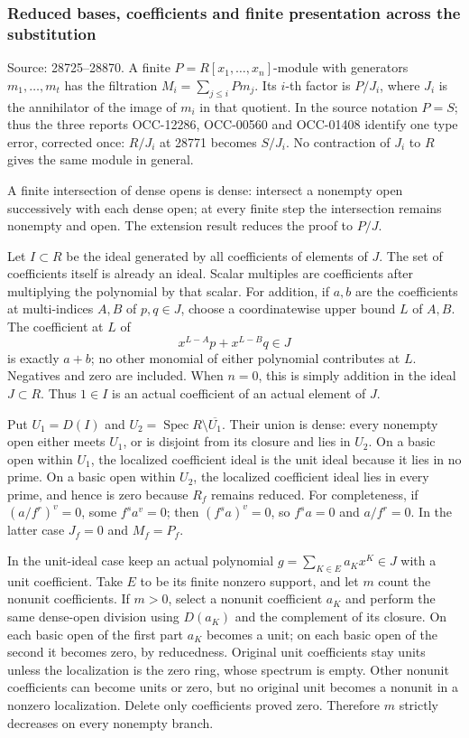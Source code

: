 \subsubsection{Reduced bases, coefficients and finite presentation across the substitution}\label{reduced-bases-coefficients-and-finite-presentation-across-the-substitution}

Source: 28725--28870. A finite \(P=R[x_1,\ldots,x_n]\)-module with generators \(m_1,\ldots,m_t\) has the filtration \(M_i=\sum_{j\le i}Pm_j\). Its \(i\)-th factor is \(P/J_i\), where \(J_i\) is the annihilator of the image of \(m_i\) in that quotient. In the source notation \(P=S\); thus the three reports OCC-12286, OCC-00560 and OCC-01408 identify one type error, corrected once: \(R/J_i\) at 28771 becomes \(S/J_i\). No contraction of \(J_i\) to \(R\) gives the same module in general.

A finite intersection of dense opens is dense: intersect a nonempty open successively with each dense open; at every finite step the intersection remains nonempty and open. The extension result reduces the proof to \(P/J\).

Let \(I\subset R\) be the ideal generated by all coefficients of elements of \(J\). The set of coefficients itself is already an ideal. Scalar multiples are coefficients after multiplying the polynomial by that scalar. For addition, if \(a,b\) are the coefficients at multi-indices \(A,B\) of \(p,q\in J\), choose a coordinatewise upper bound \(L\) of \(A,B\). The coefficient at \(L\) of \[
 x^{L-A}p+x^{L-B}q\in J
\] is exactly \(a+b\); no other monomial of either polynomial contributes at \(L\). Negatives and zero are included. When \(n=0\), this is simply addition in the ideal \(J\subset R\). Thus \(1\in I\) is an actual coefficient of an actual element of \(J\).

Put \(U_1=D(I)\) and \(U_2=\operatorname{Spec}R\setminus\overline{U_1}\). Their union is dense: every nonempty open either meets \(U_1\), or is disjoint from its closure and lies in \(U_2\). On a basic open within \(U_1\), the localized coefficient ideal is the unit ideal because it lies in no prime. On a basic open within \(U_2\), the localized coefficient ideal lies in every prime, and hence is zero because \(R_f\) remains reduced. For completeness, if \((a/f^r)^v=0\), some \(f^s a^v=0\); then \((f^s a)^v=0\), so \(f^s a=0\) and \(a/f^r=0\). In the latter case \(J_f=0\) and \(M_f=P_f\).

In the unit-ideal case keep an actual polynomial \(g=\sum_{K\in E}a_Kx^K\in J\) with a unit coefficient. Take \(E\) to be its finite nonzero support, and let \(m\) count the nonunit coefficients. If \(m>0\), select a nonunit coefficient \(a_K\) and perform the same dense-open division using \(D(a_K)\) and the complement of its closure. On each basic open of the first part \(a_K\) becomes a unit; on each basic open of the second it becomes zero, by reducedness. Original unit coefficients stay units unless the localization is the zero ring, whose spectrum is empty. Other nonunit coefficients can become units or zero, but no original unit becomes a nonunit in a nonzero localization. Delete only coefficients proved zero. Therefore \(m\) strictly decreases on every nonempty branch.


